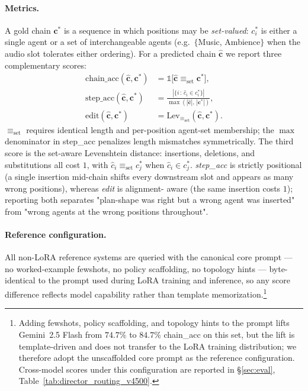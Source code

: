 \paragraph{Metrics.}
A gold chain $\mathbf{c}^*$ is a sequence in which positions may be
\emph{set-valued}: $c^*_i$ is either a single agent or a set of
interchangeable agents (e.g.\ $\{$Music, Ambience$\}$ when the audio
slot tolerates either ordering). For a predicted chain $\hat{\mathbf{c}}$
we report three complementary scores:
\begin{align}
\text{chain\_acc}(\hat{\mathbf{c}},\mathbf{c}^*) &= \mathbb{1}\!\big[\hat{\mathbf{c}}\!\equiv_\text{set}\!\mathbf{c}^*\big], \\
\text{step\_acc}(\hat{\mathbf{c}},\mathbf{c}^*) &= \frac{|\{i\,:\,\hat{c}_i\in c^*_i\}|}{\max(|\hat{\mathbf{c}}|,\,|\mathbf{c}^*|)}, \\
\text{edit}(\hat{\mathbf{c}},\mathbf{c}^*) &= \mathrm{Lev}_{\!\equiv_\text{set}}(\hat{\mathbf{c}},\mathbf{c}^*).
\end{align}
$\equiv_\text{set}$ requires identical length and per-position
agent-set membership; the $\max$ denominator in step\_acc penalizes
length mismatches symmetrically. The third score is the
set-aware Levenshtein distance: insertions, deletions, and
substitutions all cost $1$, with $\hat{c}_i\!\equiv_\text{set}\!c^*_j$
when $\hat{c}_i\!\in\!c^*_j$. \emph{step\_acc} is strictly positional
(a single insertion mid-chain shifts every downstream slot and
appears as many wrong positions), whereas \emph{edit} is alignment-
aware (the same insertion costs $1$); reporting both separates
"plan-shape was right but a wrong agent was inserted" from "wrong
agents at the wrong positions throughout".

\paragraph{Reference configuration.}
All non-LoRA reference systems are queried with the canonical core
prompt — no worked-example fewshots, no policy scaffolding, no
topology hints — byte-identical to the prompt used during LoRA
training and inference, so any score difference reflects model
capability rather than template memorization.\footnote{Adding
fewshots, policy scaffolding, and topology hints to the prompt lifts
Gemini~2.5 Flash from $74.7\%$ to $84.7\%$ chain\_acc on this set,
but the lift is template-driven and does not transfer to the LoRA
training distribution; we therefore adopt the unscaffolded core
prompt as the reference configuration. Cross-model scores under this
configuration are reported in \S\ref{sec:eval}, Table~\ref{tab:director_routing_v4500}.}
